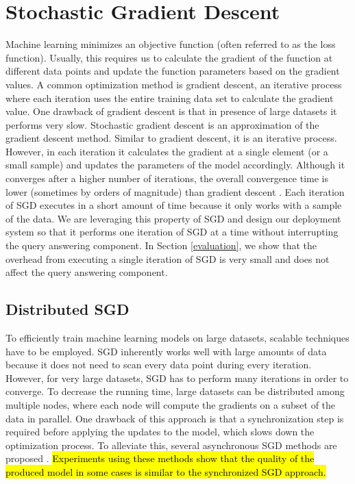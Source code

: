 \documentclass[10pt,conference,letterpaper]{IEEEtran}
\begin{document}
\section{Stochastic Gradient Descent} \label{sgd}
Machine learning minimizes an objective function (often referred to as the loss function).
Usually, this requires us to calculate the gradient of the function at different data points and update the function parameters based on the gradient values.
A common optimization method is gradient descent, an iterative process where each iteration uses the entire training data set to calculate the gradient value.
One drawback of gradient descent is that in presence of large datasets it performs very slow.
Stochastic gradient descent \cite{bottou2010large} is an approximation of the gradient descent method. 
Similar to gradient descent, it is an iterative process.
However, in each iteration it calculates the gradient at a single element (or a small sample) and updates the parameters of the model accordingly. 
Although it converges after a higher number of iterations, the overall convergence time is lower (sometimes by orders of magnitude) than gradient descent \cite{bottou2010large}. 
Each iteration of SGD executes in a short amount of time because it only works with a sample of the data.
We are leveraging this property of SGD and design our deployment system so that it performs one iteration of SGD at a time without interrupting the query answering component.
In Section \ref{evaluation}, we show that the overhead from executing a single iteration of SGD is very small and does not affect the query answering component.

\subsection{Distributed SGD}
To efficiently train machine learning models on large datasets, scalable techniques have to be employed.
SGD inherently works well with large amounts of data because it does not need to scan every data point during every iteration.
However, for very large datasets, SGD has to perform many iterations in order to converge.
To decrease the running time, large datasets can be distributed among multiple nodes, where each node will compute the gradients on a subset of the data in parallel.
One drawback of this approach is that a synchronization step is required before applying the updates to the model, which slows down the optimization process.
To alleviate this, several asynchronous SGD methods are proposed \cite{recht2011hogwild, dean2012large}. 
\hl{Experiments using these methods show that the quality of the produced model in some cases is similar to the synchronized SGD approach.}
\end{document}

